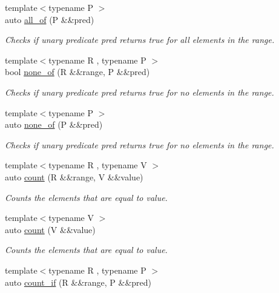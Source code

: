 \begin{DoxyCompactItemize}
{\footnotesize template$<$typename P $>$ }\\auto \mbox{\hyperlink{namespacerah_a4066165c960917a330beeed75a0f96e7}{all\+\_\+of}} (P \&\&pred)
\begin{DoxyCompactList}\small\item\em Checks if unary predicate pred returns true for all elements in the range. \end{DoxyCompactList}\item 
{\footnotesize template$<$typename R , typename P $>$ }\\bool \mbox{\hyperlink{namespacerah_a2a3ff8b7f73d480ac0827f9a41a3c92a}{none\+\_\+of}} (R \&\&range, P \&\&pred)
\begin{DoxyCompactList}\small\item\em Checks if unary predicate pred returns true for no elements in the range. \end{DoxyCompactList}\item 
{\footnotesize template$<$typename P $>$ }\\auto \mbox{\hyperlink{namespacerah_aa05e58774ee8e9e05cd3e6ed2a2fa372}{none\+\_\+of}} (P \&\&pred)
\begin{DoxyCompactList}\small\item\em Checks if unary predicate pred returns true for no elements in the range. \end{DoxyCompactList}\item 
{\footnotesize template$<$typename R , typename V $>$ }\\auto \mbox{\hyperlink{namespacerah_aa528865cc4a45d4eb276329554f16b4b}{count}} (R \&\&range, V \&\&value)
\begin{DoxyCompactList}\small\item\em Counts the elements that are equal to value. \end{DoxyCompactList}\item 
{\footnotesize template$<$typename V $>$ }\\auto \mbox{\hyperlink{namespacerah_ae8400202fc4005dbade0f479dd556ec3}{count}} (V \&\&value)
\begin{DoxyCompactList}\small\item\em Counts the elements that are equal to value. \end{DoxyCompactList}\item 
{\footnotesize template$<$typename R , typename P $>$ }\\auto \mbox{\hyperlink{namespacerah_a8e6a379c05d482a52137f5647783fe27}{count\+\_\+if}} (R \&\&range, P \&\&pred)

\end{DoxyCompactItemize}
